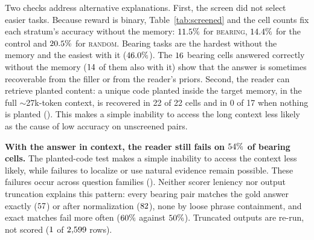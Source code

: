 Two checks address alternative explanations. First, the screen did not
select easier tasks. Because reward is binary, Table~\ref{tab:screened} and the
cell counts fix each stratum's accuracy without the memory: $11.5\%$
for \textsc{bearing}, $14.4\%$ for the control and
$20.5\%$ for \textsc{random}. Bearing tasks are the hardest without
the memory and the easiest with it ($46.0\%$). The
$16$ bearing cells answered correctly without the memory
($14$ of them also with it) show that the answer is sometimes
recoverable from the filler or from the reader's priors. Second, the reader can retrieve planted content: a unique code planted inside the target
memory, in the full $\sim$27k-token context, is recovered in 22 of 22 cells
and in 0 of 17 when nothing is planted (). This makes a simple
inability to access the long context less likely as the cause of low accuracy
on unscreened pairs.

\textbf{With the answer in context, the reader still fails on
$54\%$ of bearing cells.} The planted-code test makes a simple
inability to access the context less likely, while failures to localize or use
natural evidence remain possible. These failures occur across question families ().
Neither scorer leniency nor output truncation explains this pattern: every bearing pair matches the gold answer exactly ($57$) or after
normalization ($82$), none by loose phrase containment, and exact
matches fail more often ($60\%$ against $50\%$).
Truncated outputs are re-run, not scored ($1$ of $2{,}599$ rows).


